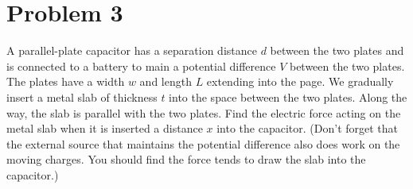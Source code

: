 \documentclass[10pt]{article}
\begin{document}
	\pagebreak

	\section*{Problem 3}
	A parallel-plate capacitor has a separation distance $d$ between the two plates and is connected to a battery
	to main a potential difference $V$ between the two plates. The plates have a width $w$ and length $L$ 
	extending  into the page. We gradually insert a metal slab of thickness $t$ into the space between the two 
	plates. Along the way, the slab is parallel with the two plates. Find the electric force acting on the 
	metal slab when it is inserted a distance $x$ into the capacitor. (Don't forget that the external source 
	that maintains the potential difference also does work on the moving charges. You should find the force
	tends to draw the slab into the capacitor.)
\end{document}
